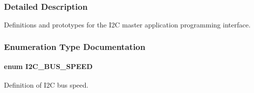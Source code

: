 \subsubsection{Detailed Description}
Definitions and prototypes for the I2C master application programming interface. 



\subsubsection{Enumeration Type Documentation}
\paragraph[{\texorpdfstring{I2\+C\+\_\+\+B\+U\+S\+\_\+\+S\+P\+E\+ED}{I2C_BUS_SPEED}}]{\setlength{\rightskip}{0pt plus 5cm}enum {\bf I2\+C\+\_\+\+B\+U\+S\+\_\+\+S\+P\+E\+ED}}\hypertarget{group___i2_c_ga92ff849d9f99fb734695416e22ca1b97}{}\label{group___i2_c_ga92ff849d9f99fb734695416e22ca1b97}


Definition of I2C bus speed. 

